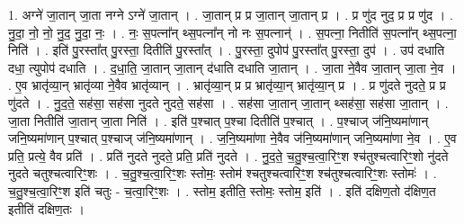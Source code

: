 \documentclass[17pt]{extarticle}
\begin{document}
1. अग्ने॑ जा॒तान् जा॒ता नग्ने ऽग्ने॑ जा॒तान् । . जा॒तान् प्र प्र जा॒तान् जा॒तान् प्र । . प्र णु॑द नुद॒ प्र प्र णु॑द । . नु॒दा॒ नो॒ नो॒ नु॒द॒ नु॒दा॒ नः॒ । . नः॒ स॒पत्ना᳚न् थ्स॒पत्ना᳚न् नो नः स॒पत्नान्॑ । . स॒पत्ना॒ नितीति॑ स॒पत्ना᳚न् थ्स॒पत्ना॒ निति॑ । . इति॑ पु॒रस्ता᳚त् पु॒रस्ता॒ दितीति॑ पु॒रस्ता᳚त् । . पु॒रस्ता॒ दुपोप॑ पु॒रस्ता᳚त् पु॒रस्ता॒ दुप॑ । . उप॑ दधाति दधा॒ त्युपोप॑ दधाति । . द॒धा॒ति॒ जा॒तान् जा॒तान् द॑धाति दधाति जा॒तान् । . जा॒ता ने॒वैव जा॒तान् जा॒ता ने॒व । . ए॒व भ्रातृ॑व्या॒न् भ्रातृ॑व्या ने॒वैव भ्रातृ॑व्यान् । . भ्रातृ॑व्या॒न् प्र प्र भ्रातृ॑व्या॒न् भ्रातृ॑व्या॒न् प्र । . प्र णु॑दते नुदते॒ प्र प्र णु॑दते । . नु॒द॒ते॒ सह॑सा॒ सह॑सा नुदते नुदते॒ सह॑सा । . सह॑सा जा॒तान् जा॒तान् थ्सह॑सा॒ सह॑सा जा॒तान् । . जा॒ता नितीति॑ जा॒तान् जा॒ता निति॑ । . इति॑ प॒श्चात् प॒श्चा दितीति॑ प॒श्चात् । . प॒श्चाज् ज॑नि॒ष्यमा॑णान् जनि॒ष्यमा॑णान् प॒श्चात् प॒श्चाज् ज॑नि॒ष्यमा॑णान् । . ज॒नि॒ष्यमा॑णा ने॒वैव ज॑नि॒ष्यमा॑णान् जनि॒ष्यमा॑णा ने॒व । . ए॒व प्रति॒ प्रत्ये॒ वैव प्रति॑ । . प्रति॑ नुदते नुदते॒ प्रति॒ प्रति॑ नुदते । . नु॒द॒ते॒ च॒तु॒श्च॒त्वा॒रिꣳ॒॒श श्च॑तुश्चत्वारिꣳ॒॒शो नु॑दते नुदते चतुश्चत्वारिꣳ॒॒शः । . च॒तु॒श्च॒त्वा॒रिꣳ॒॒शः स्तोमः॒ स्तोम॑ श्चतुश्चत्वारिꣳ॒॒श श्च॑तुश्चत्वारिꣳ॒॒शः स्तोमः॑ । . च॒तु॒श्च॒त्वा॒रिꣳ॒॒श इति॑ चतुः - च॒त्वा॒रिꣳ॒॒शः । . स्तोम॒ इतीति॒ स्तोमः॒ स्तोम॒ इति॑ । . इति॑ दक्षिण॒तो द॑क्षिण॒त इतीति॑ दक्षिण॒तः । \newline
\end{document}

